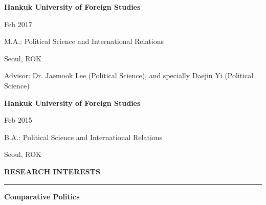 \documentclass[
  16,
]{article}
\begin{document}
\vspace{7pt}
\begin{large}
   \begin{multicols}{2}
    \begin{flushleft}{\bf Hankuk University of Foreign Studies}\end{flushleft}
    \begin{flushright}Feb 2017\end{flushright}
  \end{multicols}
  \vspace{-0.17cm}
  \begin{multicols}{2}
    \begin{flushleft}M.A.: Political Science and International Relations\end{flushleft}
    \begin{flushright}Seoul, ROK\end{flushright}
  \end{multicols}
  \vspace{-0.25cm}
  \hspace{3pt}Advisor: Dr. Jaemook Lee (Political Science), and specially Daejin Yi (Political Science)
\end{large}
\vspace{3pt}

\begin{large}
  \begin{multicols}{2}
    \begin{flushleft}{\bf Hankuk University of Foreign Studies}\end{flushleft}
    \begin{flushright}Feb 2015\end{flushright}
  \end{multicols}
  \vspace{-0.17cm}
  \begin{multicols}{2}
    \begin{flushleft}B.A.: Political Science and International Relations\end{flushleft}
    \begin{flushright}Seoul, ROK\end{flushright}
  \end{multicols}
\end{large}
\vspace{7pt}

\begin{large}{\bf RESEARCH INTERESTS}
  \vspace{3pt}
  \hrule
  \begin{multicols}{2}
    \begin{flushleft}{\bf Comparative Politics}\end{flushleft}
    \begin{flushright}\end{flushright}
  \end{multicols}
\end{large}
\vspace{-0.16cm}
\end{document}
